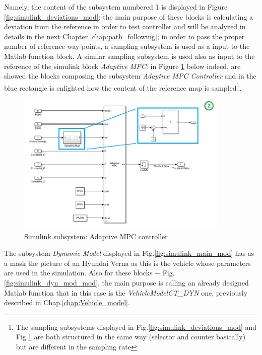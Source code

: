 Namely, the content of the subsystem numbered 1 is displayed in Figure \ref{fig:simulink_deviations_mod}: the main purpose of these blocks is calculating a deviation from the reference in order to test controller and will be analyzed in details in the next Chapter \ref{chap:path_following}; in order to pass the proper number of reference way-points, a sampling subsystem is used as a input to the Matlab function block. A similar sampling subsystem is used also as input to the reference of the simulink block \textit{Adaptive MPC}: in Figure \ref{fig:simulink_mpc_mod} below indeed, are showed the blocks composing the subsystem \textit{Adaptive MPC Controller} and in the blue rectangle is enlighted how the content of the reference map is sampled\footnote{ The sampling subsystems displayed in Fig.\ref{fig:simulink_deviations_mod} and Fig.\ref{fig:simulink_mpc_mod} are both structured in the same way (selector and counter basically) but are different in the sampling rate}.
\begin{figure}[H]
    \centering
    \includegraphics[width=0.9\textwidth]{Figures/simulink_mpc_mod.png}
    \caption{Simulink subsystem: Adaptive MPC controller}
    \label{fig:simulink_mpc_mod}
\end{figure}
The subsystem \textit{Dynamic Model} displayed in Fig.\ref{fig:simulink_main_mod} has as a mask the picture of an Hyundai Verna as this is the vehicle whose parameters are used in the simulation. Also for these blocks $-$ Fig.\ref{fig:simulink_dyn_mod_mod}, the main purpose is calling an already designed Matlab function that in this case is the \textit{VehicleModelCT\_DYN} one, previously described in Chap.\ref{chap:Vehicle_model}.
